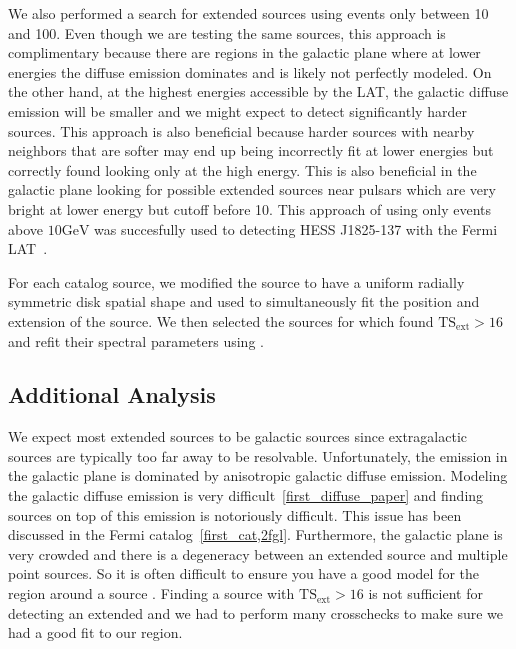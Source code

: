 \documentclass[preprint]{aastex}
\newcommand{\gev}{\text{GeV}\xspace}
\newcommand{\tsext}{{\ensuremath{\text{TS}_\text{ext}}}\xspace}
\newcommand{\pointlike}{\text{\em pointlike}\xspace}
\newcommand{\gtlike}{\text{\em gtlike}\xspace}
\begin{document}
We also performed a search for extended sources using events only between
10\gev and 100\gev. Even though we are testing the same sources, this
approach is complimentary because there are regions in the galactic
plane where at lower energies the diffuse emission dominates and is
likely not perfectly modeled. On the other hand, at the highest energies
accessible by the LAT, the galactic diffuse emission will be smaller and
we might expect to detect significantly harder sources. This approach is
also beneficial because harder sources with nearby neighbors that are
softer may end up being incorrectly fit at lower energies but correctly
found looking only at the high energy.  This is also beneficial in the
galactic plane looking for possible extended sources near pulsars which
are very bright at lower energy but cutoff before 10\gev.  This approach
of using only events above $10\gev$ was succesfully used to detecting
HESS J1825-137 with the Fermi LAT~\cite{fermi_hess_j1825}.

For each catalog source, we modified the source to have a uniform radially
symmetric disk spatial shape and used \pointlike to simultaneously fit
the position and extension of the source.  We then selected the sources
for which \pointlike found $\tsext>16$ and refit their spectral parameters
using \gtlike.


\subsection{Additional Analysis}

We expect most extended sources to be galactic sources since extragalactic
sources are typically too far away to be resolvable. Unfortunately,
the \gev emission in the galactic plane is dominated by anisotropic
galactic diffuse emission.  Modeling the galactic diffuse emission is
very difficult~\ref{first_diffuse_paper}  and finding sources on top of
this emission is notoriously difficult. This issue has been discussed
in the Fermi catalog~\ref{first_cat,2fgl}. Furthermore, the galactic plane
is very crowded and there is a degeneracy between an extended source
and multiple point sources. So it is often difficult to ensure you have
a good model for the region around a source .  Finding a source with
$\tsext>16$ is not sufficient for detecting an extended and we had to
perform many crosschecks to make sure we had a good fit to our region.
\end{document}
